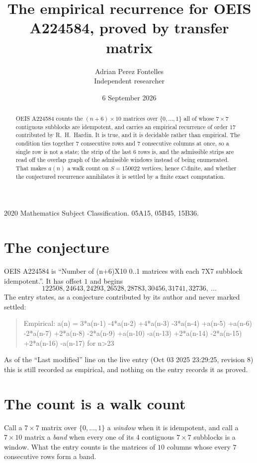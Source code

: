 \documentclass[11pt,a4paper]{article}
\title{The empirical recurrence for OEIS A224584, proved by transfer matrix}
\author{Adrian Perez Fontelles\\ \small Independent researcher}
\date{6 September 2026}
\theoremstyle{plain}
\theoremstyle{definition}
\begin{document}
\maketitle

\begin{abstract}
OEIS A224584 counts the $(n+6)\times10$ matrices over $\{0,\dots,1\}$ all of whose
$7\times7$ contiguous subblocks are idempotent, and carries an empirical recurrence of order
$17$ contributed by R.~H.~Hardin. It is true, and it is decidable rather than empirical.
The condition ties together $7$ consecutive rows and $7$ consecutive columns at once, so a
single row is not a state; the strip of the last $6$ rows is, and the admissible strips
are read off the overlap graph of the admissible windows instead of being enumerated. That
makes $a(n)$ a walk count on $S=150022$ vertices, hence $C$-finite, and whether the conjectured
recurrence annihilates it is settled by a finite exact computation.
\end{abstract}

\noindent\small 2020 Mathematics Subject Classification. 05A15, 05B45, 15B36.\normalsize

\section{The conjecture}

OEIS A224584 is ``Number of (n+6)X10 0..1 matrices with each 7X7 subblock idempotent.''. It has offset $1$ and begins
\[
122508, 24643, 24293, 26528, 28783, 30456, 31741, 32736,\ \dots
\]
The entry states, as a conjecture contributed by its author and never marked settled:
\begin{quote}
Empirical: a(n) = 3*a(n-1) -4*a(n-2) +4*a(n-3) -3*a(n-4) +a(n-5) +a(n-6) -2*a(n-7) +2*a(n-8) -2*a(n-9) +a(n-10) -a(n-13) +2*a(n-14) -2*a(n-15) +2*a(n-16) -a(n-17) for n>23
\end{quote}
As of the ``Last modified'' line on the live entry (Oct 03 2025 23:29:25, revision 8) this is still
recorded as empirical, and nothing on the entry records it as proved.

\section{The count is a walk count}

Call a $7\times7$ matrix over $\{0,\dots,1\}$ a \emph{window} when it is idempotent, and
call a $7\times10$ matrix a \emph{band} when every one of its $4$ contiguous
$7\times7$ subblocks is a window. What the entry counts is the matrices of $10$ columns
whose every $7$ consecutive rows form a band.
\end{document}
